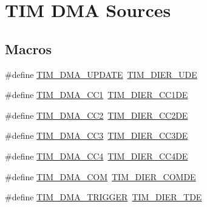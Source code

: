 \hypertarget{group___t_i_m___d_m_a__sources}{}\section{T\+IM D\+MA Sources}
\label{group___t_i_m___d_m_a__sources}
\subsection*{Macros}
\begin{DoxyCompactItemize}
\item 
\#define \mbox{\hyperlink{group___t_i_m___d_m_a__sources_ga45816ad15a4f533027eb202ac0b9aaf5}{T\+I\+M\+\_\+\+D\+M\+A\+\_\+\+U\+P\+D\+A\+TE}}~\mbox{\hyperlink{group___peripheral___registers___bits___definition_gab9f47792b1c2f123464a2955f445c811}{T\+I\+M\+\_\+\+D\+I\+E\+R\+\_\+\+U\+DE}}
\item 
\#define \mbox{\hyperlink{group___t_i_m___d_m_a__sources_ga33b93e8bb82fe8e167b9e9c962c54f83}{T\+I\+M\+\_\+\+D\+M\+A\+\_\+\+C\+C1}}~\mbox{\hyperlink{group___peripheral___registers___bits___definition_gae181bb16ec916aba8ba86f58f745fdfd}{T\+I\+M\+\_\+\+D\+I\+E\+R\+\_\+\+C\+C1\+DE}}
\item 
\#define \mbox{\hyperlink{group___t_i_m___d_m_a__sources_ga792f73196a8e7424655592097d7a3fd5}{T\+I\+M\+\_\+\+D\+M\+A\+\_\+\+C\+C2}}~\mbox{\hyperlink{group___peripheral___registers___bits___definition_ga58f97064991095b28c91028ca3cca28e}{T\+I\+M\+\_\+\+D\+I\+E\+R\+\_\+\+C\+C2\+DE}}
\item 
\#define \mbox{\hyperlink{group___t_i_m___d_m_a__sources_ga3eb2dadbd3109bced45935fb53deeee1}{T\+I\+M\+\_\+\+D\+M\+A\+\_\+\+C\+C3}}~\mbox{\hyperlink{group___peripheral___registers___bits___definition_ga1567bff5dc0564b26a8b3cff1f0fe0a4}{T\+I\+M\+\_\+\+D\+I\+E\+R\+\_\+\+C\+C3\+DE}}
\item 
\#define \mbox{\hyperlink{group___t_i_m___d_m_a__sources_ga59495cf79894dfe5e5b2029863aed956}{T\+I\+M\+\_\+\+D\+M\+A\+\_\+\+C\+C4}}~\mbox{\hyperlink{group___peripheral___registers___bits___definition_gaaba034412c54fa07024e516492748614}{T\+I\+M\+\_\+\+D\+I\+E\+R\+\_\+\+C\+C4\+DE}}
\item 
\#define \mbox{\hyperlink{group___t_i_m___d_m_a__sources_gac5f4c56e944bda8ba0c23b97275020ba}{T\+I\+M\+\_\+\+D\+M\+A\+\_\+\+C\+OM}}~\mbox{\hyperlink{group___peripheral___registers___bits___definition_ga79c3fab9d33de953a0a7f7d6516c73bc}{T\+I\+M\+\_\+\+D\+I\+E\+R\+\_\+\+C\+O\+M\+DE}}
\item 
\#define \mbox{\hyperlink{group___t_i_m___d_m_a__sources_ga21912fd910242e0f63bf9b0953e41c63}{T\+I\+M\+\_\+\+D\+M\+A\+\_\+\+T\+R\+I\+G\+G\+ER}}~\mbox{\hyperlink{group___peripheral___registers___bits___definition_ga5a752d4295f100708df9b8be5a7f439d}{T\+I\+M\+\_\+\+D\+I\+E\+R\+\_\+\+T\+DE}}
\end{DoxyCompactItemize}


